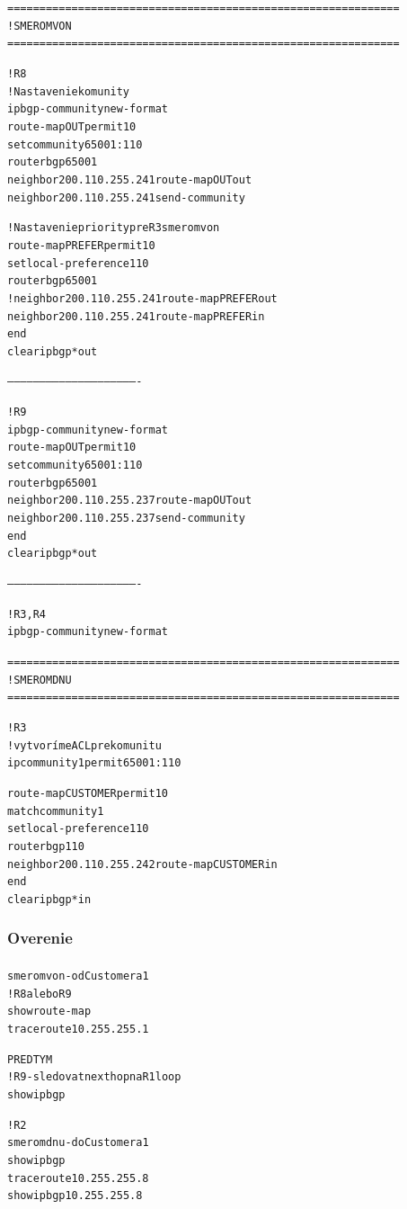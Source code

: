 \documentclass[12pt,twoside,a4paper]{report}
\begin{document}
\noindent
{\selectfont
\begin{small}
\begin{alltt}
=============================================================
!SMEROM VON
=============================================================

!R8
!Nastavenie komunity
ip bgp-community new-format
route-map OUT permit 10
  set community 65001:110
router bgp 65001
  neighbor 200.110.255.241 route-map OUT out
  neighbor 200.110.255.241 send-community

!Nastavenie priority pre R3 smerom von
route-map PREFER permit 10
  set local-preference 110
router bgp 65001
  !neighbor 200.110.255.241 route-map PREFER out
  neighbor 200.110.255.241 route-map PREFER in
end
clear ip bgp * out



-------------------------------------------------------------


!R9
ip bgp-community new-format
route-map OUT permit 10
  set community 65001:110
router bgp 65001
  neighbor 200.110.255.237 route-map OUT out
  neighbor 200.110.255.237 send-community
end
clear ip bgp * out


-------------------------------------------------------------


!R3, R4
ip bgp-community new-format






=============================================================
!SMEROM DNU
=============================================================

!R3
!vytvoríme ACL pre komunitu
ip community 1 permit 65001:110

route-map CUSTOMER permit 10
  match community 1
  set local-preference 110
router bgp 110
  neighbor 200.110.255.242 route-map CUSTOMER in
end
clear ip bgp * in
\end{alltt}
\end{small}
}

\subsubsection{Overenie}
\paragraph{}

\noindent
{\selectfont
\begin{small}
\begin{alltt}
smerom von - od Customera 1
!R8 alebo R9
show route-map
traceroute 10.255.255.1

PREDTYM
!R9 - sledovat next hop na R1 loop
show ip bgp 


!R2
smerom dnu - do Customera 1
show ip bgp
traceroute 10.255.255.8
show ip bgp 10.255.255.8
\end{alltt}
\end{small}
}
\end{document}
